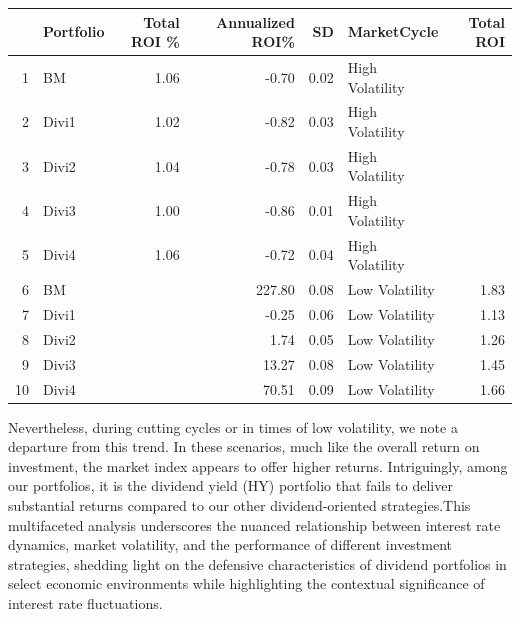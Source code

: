 \documentclass[12pt,preprint, authoryear]{elsarticle}
\let\origtable\table
\let\endorigtable\endtable
\renewenvironment{table}[1][2] {
    \expandafter\origtable\expandafter[H]
} {
    \endorigtable
}
\numberwithin{equation}{section}
\numberwithin{figure}{section}
\numberwithin{table}{section}
\begin{document}
\begin{table}[H]
\centering
\begin{tabular}{rlrrrlr}
  \hline
 & Portfolio & Total ROI \% & Annualized ROI\% & SD & MarketCycle & Total ROI \\ 
  \hline
1 & BM & 1.06 & -0.70 & 0.02 & High Volatility  &  \\ 
  2 & Divi1 & 1.02 & -0.82 & 0.03 & High Volatility  &  \\ 
  3 & Divi2 & 1.04 & -0.78 & 0.03 & High Volatility  &  \\ 
  4 & Divi3 & 1.00 & -0.86 & 0.01 & High Volatility  &  \\ 
  5 & Divi4 & 1.06 & -0.72 & 0.04 & High Volatility  &  \\ 
  6 & BM &  & 227.80 & 0.08 & Low Volatility  & 1.83 \\ 
  7 & Divi1 &  & -0.25 & 0.06 & Low Volatility  & 1.13 \\ 
  8 & Divi2 &  & 1.74 & 0.05 & Low Volatility  & 1.26 \\ 
  9 & Divi3 &  & 13.27 & 0.08 & Low Volatility  & 1.45 \\ 
  10 & Divi4 &  & 70.51 & 0.09 & Low Volatility  & 1.66 \\ 
   \hline
\end{tabular}
\caption{Market Cycle Perforomance \label{tab3}} 
\end{table}

Nevertheless, during cutting cycles or in times of low volatility, we
note a departure from this trend. In these scenarios, much like the
overall return on investment, the market index appears to offer higher
returns. Intriguingly, among our portfolios, it is the dividend yield
(HY) portfolio that fails to deliver substantial returns compared to our
other dividend-oriented strategies.This multifaceted analysis
underscores the nuanced relationship between interest rate dynamics,
market volatility, and the performance of different investment
strategies, shedding light on the defensive characteristics of dividend
portfolios in select economic environments while highlighting the
contextual significance of interest rate fluctuations.
\end{document}
